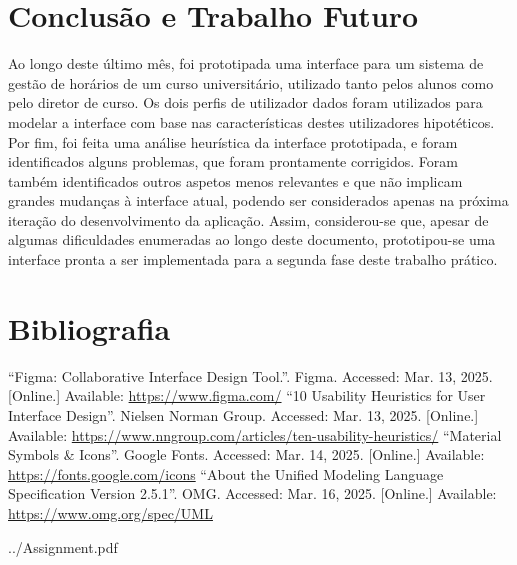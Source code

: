 \documentclass[12pt, a4paper]{article}
\begin{document}
\section{Conclusão e Trabalho Futuro}

Ao longo deste último mês, foi prototipada uma interface para um sistema de gestão de horários de um
curso universitário, utilizado tanto pelos alunos como pelo diretor de curso. Os dois perfis de
utilizador dados foram utilizados para modelar a interface com base nas características destes
utilizadores hipotéticos. Por fim, foi feita uma análise heurística da interface prototipada, e
foram identificados alguns problemas, que foram prontamente corrigidos. Foram também identificados
outros aspetos menos relevantes e que não implicam grandes mudanças à interface atual, podendo ser
considerados apenas na próxima iteração do desenvolvimento da aplicação. Assim, considerou-se que,
apesar de algumas dificuldades enumeradas ao longo deste documento, prototipou-se uma interface
pronta a ser implementada para a segunda fase deste trabalho prático.

\begingroup
\section{Bibliografia}
\renewcommand{\section}[2]{}

\begin{thebibliography}{9}
        ``Figma: Collaborative Interface Design Tool.''. Figma. Accessed: Mar. 13, 2025. [Online.]
        Available: \url{https://www.figma.com/}
        ``10 Usability Heuristics for User Interface Design''. Nielsen Norman Group.
        Accessed: Mar. 13, 2025. [Online.] Available:
        \url{https://www.nngroup.com/articles/ten-usability-heuristics/}
        ``Material Symbols \& Icons''. Google Fonts. Accessed: Mar. 14, 2025. [Online.] Available:
        \url{https://fonts.google.com/icons}
        ``About the Unified Modeling Language Specification Version 2.5.1''. OMG.
        Accessed: Mar. 16, 2025. [Online.] Available: \url{https://www.omg.org/spec/UML}
\end{thebibliography}
\endgroup


    {../Assignment.pdf}

\end{document}
